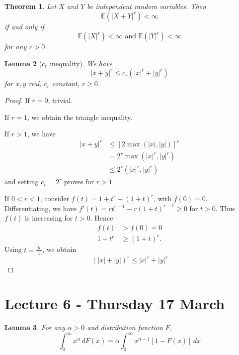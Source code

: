 \documentclass[10pt, oneside, reqno]{amsart}
\theoremstyle{plain}%
\newtheorem{thm}{Theorem}[section]
\newtheorem{lem}[thm]{Lemma}
\theoremstyle{definition}
\theoremstyle{remark}
\newcommand{\E}{\mathbb{E}}
\begin{document}
\begin{thm}
    Let $X$ and $Y$ be independent random variables.  Then \[
        \E(|X+Y|^r) < \infty
    \] if and only if \[
        \E(|X|^r) < \infty \text{ and } \E(|Y|^r) < \infty
    \] for any $r > 0$.
\end{thm}

\begin{lem}[$c_r$ inequality]
    We have \[
        |x+y|^r \leq c_r \left( |x|^r + |y|^r \right) 
    \] for $x,y$ real, $c_r$ constant, $r \geq 0$.
\end{lem}
\begin{proof}
    If $r = 0$, trivial.  
    
    If $r = 1$, we obtain the triangle inequality.
    
    If $r > 1$, we have \begin{align*}
        |x+y|^r &\leq [ 2 \max( |x|, |y|) ]^r \\
                &= 2^r \max(|x|^r, |y|^r) \\
                &\leq 2^r (|x|^r, |y|^r)
    \end{align*} and setting $c_r = 2^r$ proves for $r > 1$.
                    
    If $ 0 < r < 1$, consider $f(t) = 1 + t^r - (1+t)^r$, with $f(0) = 0$.  Differentiating, we have $f'(t) = rt^{r-1} - r(1+t)^{r-1} \geq 0$ for $t > 0$.  Thus $f(t)$ is increasing for $t >0$.  Hence \begin{align*}
        f(t) &> f(0) = 0 \\
        1+t^r &\geq (1+t)^r.
    \end{align*}  Using $t = \frac{|y|}{|x|}$, we obtain \[
        (|x| + |y|)^r \leq |x|^r + |y|^r
    \]
    
\end{proof}


\section{Lecture 6 - Thursday 17 March} %
\label{sec:lecture_6_thursday_17_march}
\begin{lem}
    For any $\alpha > 0$ and distribution function $F$, \[
        \int_0^\infty x^{\alpha} \, dF(x) = \alpha \int_0^\infty x^{\alpha - 1} [ 1 - F(x)] \, dx
    \]
\end{lem}
\end{document}
